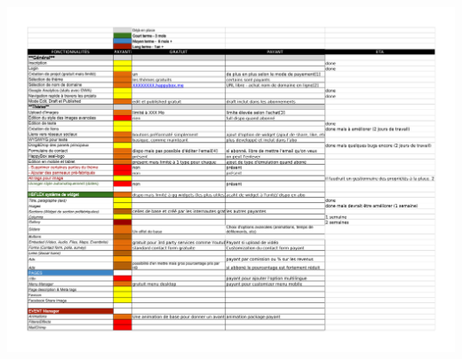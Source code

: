 \documentclass[11pt, a4paper ]{article}
\begin{document}
\begin{spacing}{1.5}
	\includegraphics[width=\textwidth]{doc/f2p.pdf}


	
	
\end{spacing}
\end{document}
